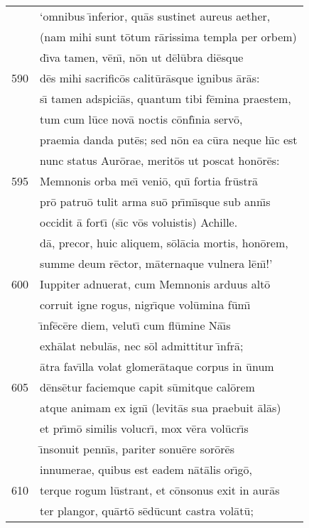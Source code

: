 \documentclass[paper=6in:9in,pagesize=pdftex,
               headinclude=on,footinclude=on,12pt]{scrbook}
\begin{document}
\begin{longtable}[p]{ r l }
 & `omnibus \={\i}nferior, qu\=as sustinet aureus aether,\\ 
 & (nam mihi sunt t\=otum r\=arissima templa per orbem)\\ 
 & d\={\i}va tamen, v\=en\={\i}, n\=on ut d\=el\=ubra di\=esque\\ 
590 & d\=es mihi sacrific\=os calit\=ur\=asque ignibus \=ar\=as:\\ 
 & s\={\i} tamen adspici\=as, quantum tibi f\=emina praestem,\\ 
 & tum cum l\=uce nov\=a noctis c\=onf\={\i}nia serv\=o,\\ 
 & praemia danda put\=es; sed n\=on ea c\=ura neque h\={\i}c est\\ 
 & nunc status Aur\=orae, merit\=os ut poscat hon\=or\=es:\\ 
595 & Memnonis orba me\={\i} veni\=o, qu\={\i} fortia fr\=ustr\=a\\ 
 & pr\=o patru\=o tulit arma su\=o pr\={\i}m\={\i}sque sub ann\={\i}s\\ 
 & occidit \=a fort\={\i} (s\={\i}c v\=os voluistis) Achille.\\ 
 & d\=a, precor, huic aliquem, s\=ol\=acia mortis, hon\=orem,\\ 
 & summe deum r\=ector, m\=aternaque vulnera l\=en\={\i}!'\\ 
600 & Iuppiter adnuerat, cum Memnonis arduus alt\=o\\ 
 & corruit igne rogus, nigr\={\i}que vol\=umina f\=um\={\i}\\ 
 & \={\i}nf\=ec\=ere diem, velut\={\i} cum fl\=umine N\=a\={\i}s\\ 
 & exh\=alat nebul\=as, nec s\=ol admittitur \={\i}nfr\=a;\\ 
 & \=atra fav\={\i}lla volat glomer\=ataque corpus in \=unum\\ 
605 & d\=ens\=etur faciemque capit s\=umitque cal\=orem\\ 
 & atque animam ex ign\={\i} (levit\=as sua praebuit \=al\=as)\\ 
 & et pr\={\i}m\=o similis volucr\={\i}, mox v\=era vol\=ucr\={\i}s\\ 
 & \={\i}nsonuit penn\={\i}s, pariter sonu\=ere sor\=or\=es\\ 
 & innumerae, quibus est eadem n\=at\=alis or\={\i}g\=o,\\ 
610 & terque rogum l\=ustrant, et c\=onsonus exit in aur\=as\\ 
 & ter plangor, qu\=art\=o s\=ed\=ucunt castra vol\=at\=u;\\ 

\end{longtable}
\end{document}
